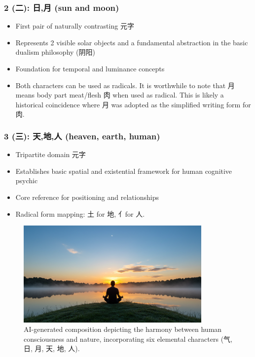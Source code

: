 \documentclass[11pt,letterpaper]{article}
\begin{document}
\subsubsection{2 (二): 日,月 (sun and moon)} 
  

  \begin{itemize}
  \tightlist
  \item
    First pair of naturally contrasting 元字
  \item
    Represents 2 visible solar objects and a fundamental abstraction in
    the basic dualism philosophy (阴阳)
  \item
    Foundation for temporal and luminance concepts
  \item
    Both characters can be used as radicals. It is worthwhile to note
    that 月 means body part meat/flesh 肉 when used as radical. This is
    likely a historical coincidence where 月 was adopted as the
    simplified writing form for 肉.
  \end{itemize}

\subsubsection{3 (三): 天,地,人 (heaven, earth, human)} 
  

  \begin{itemize}
  \tightlist
  \item
    Tripartite domain 元字
  \item
    Establishes basic spatial and existential framework for human
    cognitive psychic
  \item
    Core reference for positioning and relationships
  \item
    Radical form mapping: 土 for 地, 亻for 人.
  \end{itemize}

\begin{figure}
\centering
\includegraphics[width=0.85\textwidth]{./images/sun-moon-heaven-human-earth-meditation-morning.jpg}
\caption{AI-generated composition depicting the harmony between human consciousness and nature, incorporating six elemental characters (气, 日, 月, 天, 地, 人).}
\end{figure}
\end{document}
